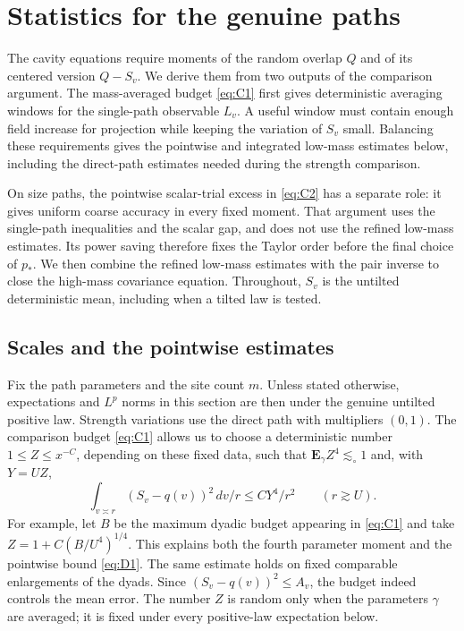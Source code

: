 \section{Statistics for the genuine paths}\label{sec:statistics}

The cavity equations require moments of the random overlap $Q$ and
of its centered version $Q-S_v$.  We derive them from two outputs of
the comparison argument.  The mass-averaged budget \eqref{eq:C1}
first gives deterministic averaging windows for the single-path
observable $L_v$.  A useful window must contain enough field increase
for projection while keeping the variation of $S_v$ small.  Balancing
these requirements gives the pointwise and integrated low-mass
estimates below, including the direct-path estimates needed during
the strength comparison.

On size paths, the pointwise scalar-trial excess in \eqref{eq:C2}
has a separate role: it gives uniform coarse accuracy in every fixed
moment.  That argument uses the single-path inequalities and the scalar
gap, and does not use the refined low-mass estimates.  Its power saving
therefore fixes the Taylor order before the final choice of $p_*$.
We then combine the refined low-mass estimates with the pair inverse
to close the high-mass covariance equation.  Throughout, $S_v$ is
the untilted deterministic mean, including when a tilted law is tested.

\subsection{Scales and the pointwise estimates}

Fix the path parameters and the site count $m$.  Unless stated
otherwise, expectations and $L^p$ norms in this section are then under
the genuine untilted positive law.  Strength variations use the direct
path with multipliers $(0,1)$.  The comparison budget \eqref{eq:C1}
allows us to choose a deterministic number $1\le Z\le x^{-C}$, depending
on these fixed data, such that $\mathbf E_\gamma Z^4\lesssim_\circ1$ and,
with $Y=UZ$,
\begin{equation}
\int_{v\asymp r} (S_v-q(v))^2\,dv/r\le C Y^4/r^2\qquad(r\gtrsim U).       \tag{D1}\label{eq:D1}
\end{equation}
For example, let $B$ be the maximum dyadic budget appearing in
\eqref{eq:C1} and take $Z=1+C(B/U^4)^{1/4}$.  This explains both the
fourth parameter moment and the pointwise bound \eqref{eq:D1}.
The same estimate holds on fixed comparable enlargements of the dyads.
Since $(S_v-q(v))^2\le A_v$, the budget indeed controls the mean error.
The number $Z$ is random only when the parameters $\gamma$ are averaged;
it is fixed under every positive-law expectation below.

